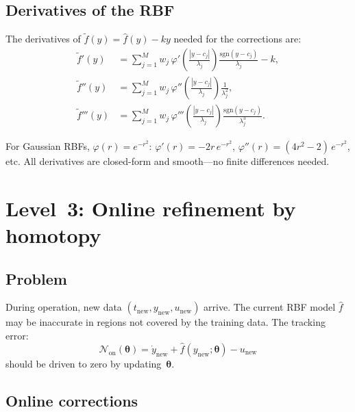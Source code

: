 \documentclass[11pt,a4paper]{article}
\begin{document}
\subsection{Derivatives of the RBF}

The derivatives of $\tilde{f}(y) = \hat{f}(y) - ky$ needed for the corrections are:
\begin{align}
\tilde{f}'(y) &= \sum_{j=1}^{M} w_j\,\varphi'\!\left(\frac{|y - c_j|}{\lambda_j}\right)\frac{\mathrm{sgn}(y - c_j)}{\lambda_j} - k, \label{eq:df-rbf} \\
\tilde{f}''(y) &= \sum_{j=1}^{M} w_j\,\varphi''\!\left(\frac{|y - c_j|}{\lambda_j}\right)\frac{1}{\lambda_j^2}, \label{eq:d2f-rbf} \\
\tilde{f}'''(y) &= \sum_{j=1}^{M} w_j\,\varphi'''\!\left(\frac{|y - c_j|}{\lambda_j}\right)\frac{\mathrm{sgn}(y - c_j)}{\lambda_j^3}. \label{eq:d3f-rbf}
\end{align}

For Gaussian RBFs, $\varphi(r) = e^{-r^2}$: $\varphi'(r) = -2r\,e^{-r^2}$, $\varphi''(r) = (4r^2 - 2)\,e^{-r^2}$, etc. All derivatives are closed-form and smooth---no finite differences needed.


\section{Level~3: Online refinement by homotopy}
\label{sec:online}

\subsection{Problem}

During operation, new data $(t_{\mathrm{new}}, y_{\mathrm{new}}, u_{\mathrm{new}})$ arrive. The current RBF model $\hat{f}$ may be inaccurate in regions not covered by the training data. The tracking error:
\begin{equation}
\mathcal{N}_{\mathrm{on}}(\boldsymbol{\theta}) = \dot{y}_{\mathrm{new}} + \hat{f}(y_{\mathrm{new}}; \boldsymbol{\theta}) - u_{\mathrm{new}}
\label{eq:N-online}
\end{equation}
should be driven to zero by updating~$\boldsymbol{\theta}$.

\subsection{Online corrections}
\end{document}
